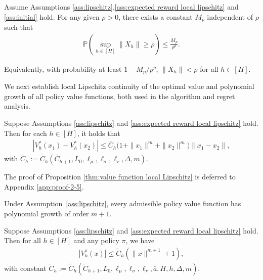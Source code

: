 \documentclass[final,supplement]{siamart251216}
\begin{document}
\begin{corollary}\label{Theorem: R-estimate}
Assume Assumptions \ref{ass:lipschitz},\ref{ass:expected reward local lipschitz} and \ref{ass:initial} hold.  For any given  $\rho>0$, there exists a constant $M_{p}$ independent of $\rho$ such that
\begin{eqnarray*}
\mathbb{P}\left(\sup_{h\in[H]}\|X_{h}\|\geq \rho\right) \leq \frac{M_{p}}{\rho^{p}}. 
\end{eqnarray*}
\end{corollary}
Equivalently, with probability at least $1-M_p/\rho^p$,
$\|X_h\|<\rho$ for all $h\in[H]$.

We next establish local Lipschitz continuity of the optimal value 
and polynomial growth of all policy value functions, both used in the
algorithm and regret analysis.

\begin{proposition}\label{thm:value function local Lipschitz}
Suppose Assumptions \ref{ass:lipschitz} and \ref{ass:expected reward local lipschitz} hold. Then for each  $h \in [H]$, it holds that
\begin{eqnarray}\label{eq:value function local Lipschitz}
   | V_{h}^{*}(x_1)- V_{h}^{*}(x_2)|\leq \overline{C}_{h}\Big(1 + \|x_1\|^m +\|x_2\|^m\Big)\|x_1-x_2\|,
\end{eqnarray}
 with $\overline{C}_{h}:=\overline{C}_{h}(\overline{C}_{h+1},L_{0},\ell_{\mu},\ell_{\sigma},\ell_{r},\Delta,m)$.
 \end{proposition}


The proof of Proposition \ref{thm:value function local Lipschitz} is deferred to Appendix \ref{app:proof-2-5}. 

Under Assumption~\ref{ass:lipschitz}, every admissible policy value function
has polynomial growth of order $m+1$.


\begin{proposition} \label{thm: value function with any policy growth rate}
Suppose Assumptions \ref{ass:lipschitz} and \ref{ass:expected reward local lipschitz} hold. Then for all $h \in [H]$ and any policy $\pi$, we have
\begin{eqnarray}\label{eq:value function with any policy growth rate}
    |V_{h}^{\pi}(x)|\leq\widetilde{C}_{h}(\|x\|^{m+1}+1),
\end{eqnarray}
 with constant $\widetilde{C}_{h}:=\widetilde{C}_{h}(\widetilde{C}_{h+1}, L_{0},\ell_{\mu},\ell_{\sigma},\ell_{r},\bar{a},H,h,\Delta,m)$. 
\end{proposition} 
\end{document}
